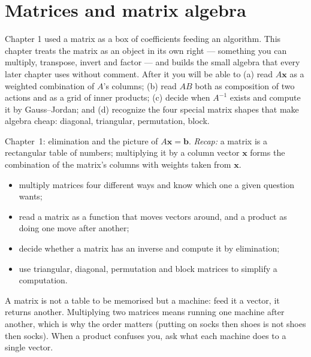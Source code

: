 \chapter{Matrices and matrix algebra}\label{ch:matrices}

Chapter 1 used a matrix as a box of coefficients feeding an algorithm. This chapter treats the matrix as an object in its own right — something you can multiply, transpose, invert and factor — and builds the small algebra that every later chapter uses without comment. After it you will be able to (a) read $A\mathbf{x}$ as a weighted combination of $A$'s columns; (b) read $AB$ both as composition of two actions and as a grid of inner products; (c) decide when $A^{-1}$ exists and compute it by Gauss--Jordan; and (d) recognize the four special matrix shapes that make algebra cheap: diagonal, triangular, permutation, block.

\begin{rulebox}
Chapter~1: elimination and the picture of $A\mathbf x=\mathbf b$. \emph{Recap:} a matrix is a rectangular table of numbers; multiplying it by a column vector $\mathbf x$ forms the combination of the matrix's columns with weights taken from $\mathbf x$.
\end{rulebox}
\begin{wins}
\begin{itemize}
\item multiply matrices four different ways and know which one a given question wants;
\item read a matrix as a function that moves vectors around, and a product as doing one move after another;
\item decide whether a matrix has an inverse and compute it by elimination;
\item use triangular, diagonal, permutation and block matrices to simplify a computation.
\end{itemize}
\end{wins}
\begin{principle}
A matrix is not a table to be memorised but a machine: feed it a vector, it returns another. Multiplying two matrices means running one machine after another, which is why the order matters (putting on socks then shoes is not shoes then socks). When a product confuses you, ask what each machine does to a single vector.
\end{principle}

